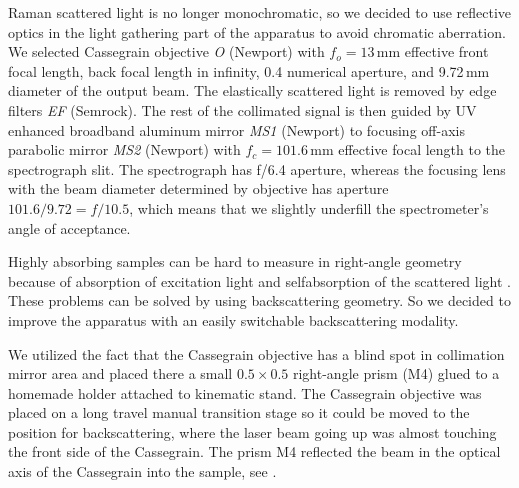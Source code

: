 Raman scattered light is no longer monochromatic, so we decided to use
reflective optics in the light gathering part of the apparatus to avoid
chromatic aberration.
We selected Cassegrain objective \emph{O} (Newport) with $f_o = 13$\,mm
effective front focal length, back focal length in infinity, 0.4 numerical
aperture, and 9.72\,mm diameter of the output beam.
The elastically scattered light is removed by edge filters \emph{EF} (Semrock).
The rest of the collimated signal is then guided by UV enhanced broadband
aluminum mirror \emph{MS1} (Newport) to focusing off-axis parabolic mirror
\emph{MS2} (Newport) with $f_c = 101.6$\,mm effective focal length to the
spectrograph slit.
The spectrograph has f/6.4 aperture, whereas the focusing lens with the
beam diameter determined by objective has aperture $101.6 / 9.72 = f/10.5$,
which means that we slightly underfill the spectrometer's angle of acceptance.

Highly absorbing samples can be hard to measure in right-angle geometry
because of absorption of excitation light and selfabsorption of the scattered
light \parencite{Shriver1974}.
These problems can be solved by using backscattering geometry.
So we decided to improve the apparatus with an easily switchable
backscattering modality.

We utilized the fact that the Cassegrain objective has a blind spot in
collimation mirror area and placed there a small $0.5 \times 0.5$ right-angle
prism (M4) glued to a homemade holder attached to kinematic stand.
The Cassegrain objective was placed on a long travel manual transition stage so
it could be moved to the position for backscattering, where the laser beam
going up was almost touching the front side of the Cassegrain.
The prism M4 reflected the beam in the optical axis of the Cassegrain into the
sample, see
.

